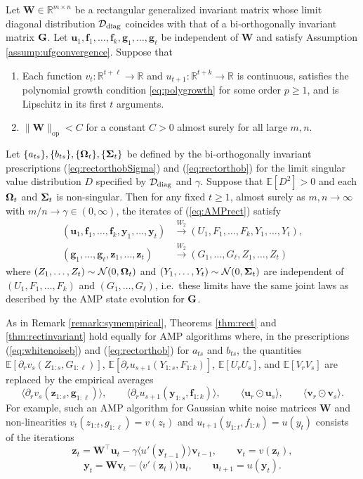 \documentclass[10pt,reqno]{amsart}
\def\u{\mathbf{u}}
\def\v{\mathbf{v}}
\def\y{\mathbf{y}}
\def\z{\mathbf{z}}
\def\f{\mathbf{f}}
\def\g{\mathbf{g}}
\def\W{\mathbf{W}}
\def\E{\mathbb{E}}
\def\R{\mathbb{R}}
\def\op{\mathrm{op}}
\def\Normal{\mathcal{N}}
\def\toWtwo{\overset{W_2}{\to}}
\newcommand{\tdiag}{\mathrm{diag}}
\begin{document}
\begin{theorem}\label{thm:rectinvariant}
Let $\W \in \R^{m \times n}$ be a rectangular generalized invariant matrix
whose limit diagonal distribution $\cD_\tdiag$ coincides with that of a
bi-orthogonally invariant matrix $\mathbf{G}$.
Let $\u_1,\f_1,\ldots,\f_k,\g_1,\ldots,\g_\ell$ be independent of $\W$ 
and satisfy Assumption \ref{assump:ufgconvergence}. Suppose that
\begin{enumerate}
\item Each function $v_t:\R^{t+\ell} \to \R$ and
$u_{t+1}:\R^{t+k} \to \R$ is continuous, satisfies the 
polynomial growth condition \eqref{eq:polygrowth} for some order $p \geq 1$, 
and is Lipschitz in its first $t$ arguments.
\item $\|\W\|_\op<C$ for a constant $C>0$ almost surely for all large $m,n$.
\end{enumerate}
Let $\{a_{ts}\},\{b_{ts}\},\{\bm{\Omega}_t\},\{\bm{\Sigma}_t\}$ be defined by the
bi-orthogonally invariant prescriptions (\ref{eq:rectorthobSigma}) and
(\ref{eq:rectorthob}) for the limit singular value distribution $D$
specified by $\cD_{\tdiag}$ and $\gamma$.
Suppose that $\E[D^2]>0$ and each $\bm{\Omega}_t$ and $\bm{\Sigma}_t$ is non-singular.
Then for any fixed $t \geq 1$, almost surely as $m,n \to \infty$ with
$m/n \to \gamma \in (0,\infty)$, the iterates of (\ref{eq:AMPrect}) satisfy
\begin{align*}
(\u_1,\f_1,\ldots,\f_k,\y_1,\ldots,\y_t) &\toWtwo (U_1,F_1,\ldots,F_k,
Y_1,\ldots,Y_t),\\
(\g_1,\ldots,\g_\ell,\z_1,\ldots,\z_t) &\toWtwo
(G_1,\ldots,G_\ell,Z_1,\ldots,Z_t)
\end{align*}
where $(Z_1,\ldots,Z_t) \sim \Normal(0,\bOmega_t)$ and $(Y_1,\ldots,Y_t) \sim
\Normal(0,\bSigma_t)$ are independent of $(U_1,F_1,\ldots,F_k)$ and
$(G_1,\ldots,G_\ell)$, i.e.\ these limits have the same joint laws as
described by the AMP state evolution for $\mathbf{G}$.
\end{theorem}

\begin{remark}\label{remark:rectempirical}
As in Remark \ref{remark:symempirical},
Theorems \ref{thm:rect} and \ref{thm:rectinvariant} hold equally for AMP
algorithms where, in the prescriptions (\ref{eq:whitenoiseb}) and
(\ref{eq:rectorthob}) for $a_{ts}$ and $b_{ts}$, the quantities
$\E[\partial_r v_s(Z_{1:s},G_{1:\ell})]$,
$\E[\partial_r u_{s+1}(Y_{1:s},F_{1:k})]$, $\E[U_rU_s]$, and $\E[V_rV_s]$ are
replaced by the empirical averages
\[\langle \partial_r v_s(\z_{1:s},\g_{1:\ell}) \rangle, \qquad
\langle \partial_r u_{s+1}(\y_{1:s},\f_{1:k}) \rangle, \qquad
\langle \u_r \odot \u_s \rangle, \qquad \langle \v_r \odot \v_s \rangle.\]
For example, such an AMP algorithm for Gaussian white noise matrices $\W$ and
non-linearities $v_t(z_{1:t},g_{1:\ell})=v(z_t)$ and
$u_{t+1}(y_{1:t},f_{1:k})=u(y_t)$ consists of the iterations
\[\z_t=\W^\top \u_t-\gamma \langle u'(\y_{t-1}) \rangle \v_{t-1}, 
\qquad \v_t=v(\z_t),\]
\[\y_t=\W\v_t-\langle v'(\z_t) \rangle \u_t, 
\qquad \u_{t+1}=u(\y_t).\]
\end{remark}
\end{document}
